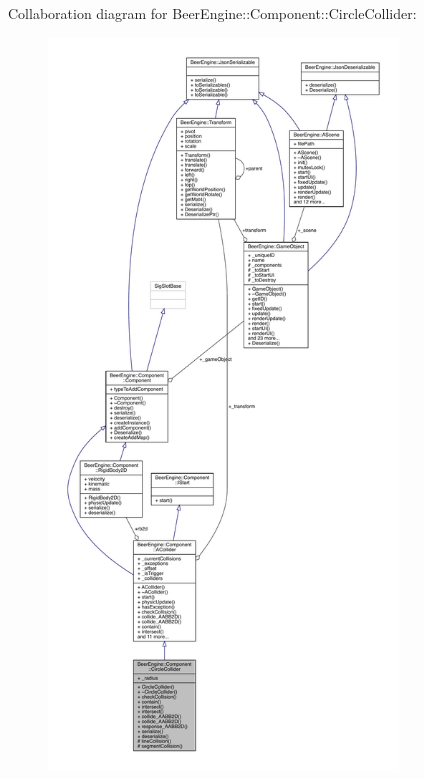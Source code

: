 Collaboration diagram for Beer\+Engine\+:\+:Component\+:\+:Circle\+Collider\+:
\nopagebreak
\begin{figure}[H]
\begin{center}
\leavevmode
\includegraphics[height=550pt]{class_beer_engine_1_1_component_1_1_circle_collider__coll__graph}
\end{center}
\end{figure}
